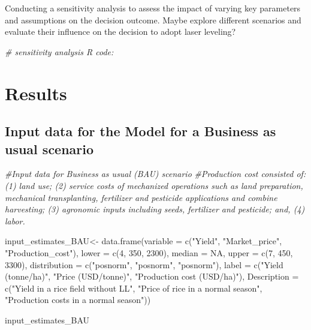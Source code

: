 \documentclass[
]{article}
\newenvironment{Shaded}{\begin{snugshade}}{\end{snugshade}}
\newcommand{\AttributeTok}[1]{\textcolor[rgb]{0.77,0.63,0.00}{#1}}
\newcommand{\CommentTok}[1]{\textcolor[rgb]{0.56,0.35,0.01}{\textit{#1}}}
\newcommand{\ConstantTok}[1]{\textcolor[rgb]{0.00,0.00,0.00}{#1}}
\newcommand{\DecValTok}[1]{\textcolor[rgb]{0.00,0.00,0.81}{#1}}
\newcommand{\FunctionTok}[1]{\textcolor[rgb]{0.00,0.00,0.00}{#1}}
\newcommand{\NormalTok}[1]{#1}
\newcommand{\OtherTok}[1]{\textcolor[rgb]{0.56,0.35,0.01}{#1}}
\newcommand{\StringTok}[1]{\textcolor[rgb]{0.31,0.60,0.02}{#1}}
\begin{document}
Conducting a sensitivity analysis to assess the impact of varying key
parameters and assumptions on the decision outcome. Maybe explore
different scenarios and evaluate their influence on the decision to
adopt laser leveling?

\begin{Shaded}
\begin{Highlighting}[]
\CommentTok{\# sensitivity analysis R code:}
\end{Highlighting}
\end{Shaded}

\hypertarget{results}{%
\section{Results}\label{results}}

\hypertarget{input-data-for-the-model-for-a-business-as-usual-scenario}{%
\subsection{Input data for the Model for a Business as usual
scenario}\label{input-data-for-the-model-for-a-business-as-usual-scenario}}

\begin{Shaded}
\begin{Highlighting}[]
\CommentTok{\#Input data for Business as usual (BAU) scenario }
\CommentTok{\#Production cost consisted of: (1) land use; (2) service costs of mechanized operations such as land preparation, mechanical transplanting, fertilizer and pesticide applications and combine harvesting; (3) agronomic inputs including seeds, fertilizer and pesticide; and, (4) labor.}

\NormalTok{input\_estimates\_BAU}\OtherTok{\textless{}{-}} \FunctionTok{data.frame}\NormalTok{(}\AttributeTok{variable =} \FunctionTok{c}\NormalTok{(}\StringTok{"Yield"}\NormalTok{, }\StringTok{"Market\_price"}\NormalTok{, }\StringTok{"Production\_cost"}\NormalTok{),}
                    \AttributeTok{lower =} \FunctionTok{c}\NormalTok{(}\DecValTok{4}\NormalTok{, }\DecValTok{350}\NormalTok{, }\DecValTok{2300}\NormalTok{),}
                    \AttributeTok{median =} \ConstantTok{NA}\NormalTok{,}
                    \AttributeTok{upper =} \FunctionTok{c}\NormalTok{(}\DecValTok{7}\NormalTok{, }\DecValTok{450}\NormalTok{, }\DecValTok{3300}\NormalTok{),}
                    \AttributeTok{distribution =} \FunctionTok{c}\NormalTok{(}\StringTok{"posnorm"}\NormalTok{, }\StringTok{"posnorm"}\NormalTok{, }\StringTok{"posnorm"}\NormalTok{),}
                    \AttributeTok{label =} \FunctionTok{c}\NormalTok{(}\StringTok{"Yield (tonne/ha)"}\NormalTok{, }\StringTok{"Price (USD/tonne)"}\NormalTok{, }\StringTok{"Production cost (USD/ha)"}\NormalTok{),}
                    \AttributeTok{Description =} \FunctionTok{c}\NormalTok{(}\StringTok{"Yield in a rice field without LL"}\NormalTok{,}
                                    \StringTok{"Price of rice in a normal season"}\NormalTok{,}
                                    \StringTok{"Production costs in a normal season"}\NormalTok{))}

\NormalTok{input\_estimates\_BAU}
\end{Highlighting}
\end{Shaded}
\end{document}
